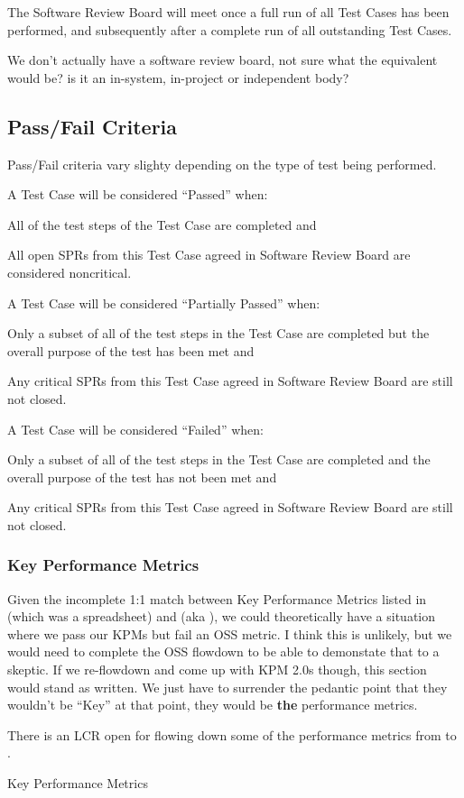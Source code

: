 
The Software Review Board will meet once a full run of all Test Cases has been performed, and subsequently after a complete run of all outstanding Test Cases.

\begin{note}
We don't actually have a software review board, not sure what the equivalent would be? is it an in-system, in-project or independent body?
\end{note}


\subsection{Pass/Fail Criteria}

Pass/Fail criteria vary slighty depending on the type of test being performed.


A Test Case will be considered ``Passed'' when:
\begin{itemize_single}
\item All of the test steps of the Test Case are completed and
\item All open SPRs from this Test Case agreed in Software Review Board are considered noncritical.
\end{itemize_single}

A Test Case will be considered ``Partially Passed'' when:
\begin{itemize_single}
\item Only a subset of all of the test steps in the Test Case are completed but the overall purpose of the test has been met and
\item Any critical SPRs from this Test Case agreed in Software Review Board are still not closed.
\end{itemize_single}

A Test Case will be considered ``Failed'' when:
\begin{itemize_single}
\item Only a subset of all of the test steps in the Test Case are completed and the overall purpose of the test has not been met and
\item Any critical SPRs from this Test Case agreed in Software Review Board are still not closed.
\end{itemize_single}

\subsubsection{Key Performance Metrics}

\begin{note}
Given the incomplete 1:1 match between Key Performance Metrics listed in  (which was a spreadsheet) and  (aka \OSS), we could theoretically have a situation where we pass our KPMs but fail an OSS metric. I think this is unlikely, but we would need to complete the OSS flowdown to be able to demonstate that to a skeptic. If we re-flowdown and come up with KPM 2.0s though, this section would stand as written. We just have to surrender the pedantic point that they wouldn't be ``Key'' at that point, they would be \textbf{the} performance metrics.
\end{note}

\begin{note}
  There is an LCR open for flowing down some of the performance metrics from \LSR to \OSS.
\end{note}

Key Performance Metrics
